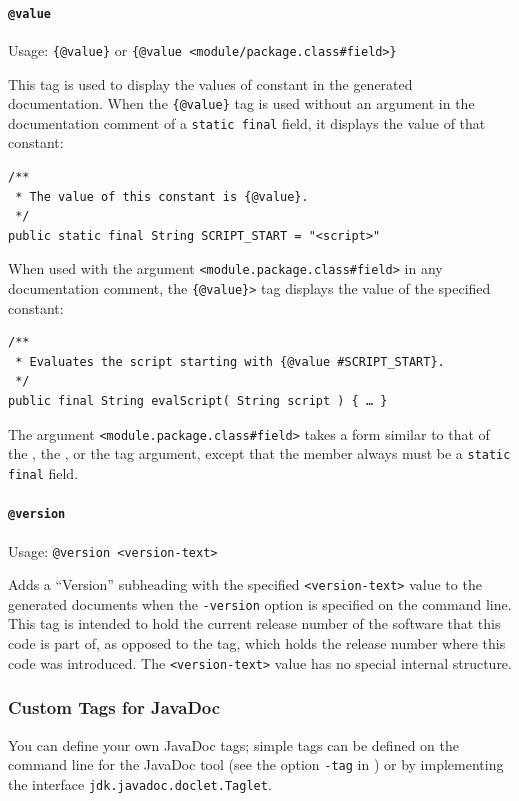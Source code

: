 \documentclass[11pt,a4paper, titlepage, parskip=half, headsepline, footsepline, cleardoublepage=current, headheight=1cm]{scrbook}
\begin{document}
\paragraph{\lstinline|@value|}\label{sec:TagValue}  Usage: \lstinline|{@value}| or \lstinline|{@value <module/package.class#field>}|

This tag is used to display the values of constant in the generated documentation. When the \lstinline|{@value}| tag is used without an argument in the documentation comment of a \lstinline|static final| field, it displays the value of that constant:
\begin{lstlisting}
/**
 * The value of this constant is {@value}.
 */
public static final String SCRIPT_START = "<script>"
\end{lstlisting}

When used with the argument \verb|<module.package.class#field>| in any documentation comment, the \lstinline|{@value}>| tag displays the value of the specified constant:
\begin{lstlisting}
/**
 * Evaluates the script starting with {@value #SCRIPT_START}.
 */
public final String evalScript( String script ) { … }
\end{lstlisting}
The argument \verb|<module.package.class#field>| takes a form similar to that of the , the , or the  tag argument, except that the member always must be a \lstinline|static final| field.

\paragraph{\lstinline|@version|}\label{sec:TagVersion}  Usage: \lstinline|@version <version-text>|

Adds a “Version” subheading with the specified \verb#<version-text># value to the generated documents when the \verb#-version# option is specified on the command line. This tag is intended to hold the current release number of the software that this code is part of, as opposed to the  tag, which holds the release number where this code was introduced. The \verb#<version-text># value has no special internal structure.


\subsubsection{Custom Tags for JavaDoc}\label{sec:CustomTagsForJavaDoc}
You can define your own JavaDoc tags; simple tags can be defined on the command line for the JavaDoc tool (see the option \verb#-tag# in \autocite{ORACLE_DOC_JAVADOC_MAN:StandardDocletOptions}) or by implementing the interface \lstinline|jdk.javadoc.doclet.Taglet|\autocite{ORACLE_DOC_TAGLET_INTERFACE}.
\end{document}
